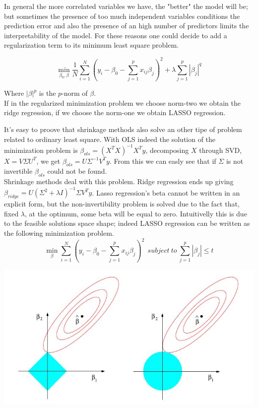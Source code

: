\documentclass{article}%
\begin{document}
In general the more correlated variables we have, the "better" the model will be; but sometimes the presence of too much independent variables conditions the prediction error and also the presence of an high number of predictors limits the interpretability of the model. For these reasons one could decide to add a regularization term to its minimum least square problem.

\[
\min_{\beta_0 , \beta} \frac{1}{N} \sum_{i=1}^N (y_i-\beta_0 - \sum_{j=1}^p x_{ij}\beta_j)^2 + \lambda\sum_{j=1}^p |\beta_j |^q 
\]

Where $|\beta|^p$ is the $p$-norm of $\beta$.
\\

If in the regularized minimization problem we choose norm-two we obtain the ridge regression, if we choose the norm-one we obtain LASSO regression. 


It's easy to proove that shrinkage methods also solve an other tipe of problem related to ordinary least square. With OLS indeed the solution of the minimization problem is $ \beta_{ols}=(X^TX)^{-1}X^Ty$, decomposing $X$ through SVD, $X=V\Sigma U^T$, we get $\beta_{ols}=U\Sigma^{-1}V^Ty$. From this we can easly see that if $\Sigma$ is not invertible $\beta_{ols}$ could not be found.
\\

Shrinkage methods deal with this problem. Ridge regression ends up giving $\beta_{ridge}=U(\Sigma^2+\lambda I)^{-1} \Sigma V^T y$. Lasso regression's beta cannot be written in an explicit form, but the non-invertibility problem is solved due to the fact that, fixed $\lambda$, at the optimum, some beta will be equal to zero. Intuitivelly this is due to the feasible solutions space shape; indeed LASSO regression can be written as the following minimization problem.
\begin{equation}
 \min_{\beta} \sum_{i=1}^N ( y_i -\beta_0 -\sum_{j=1}^p x_{ij} \beta_j)^2 ~~subject~to~\sum_{j=1}^p |\beta_j| \leq t
\end{equation}

\includegraphics[scale=0.75]{lasso}
\end{document}
